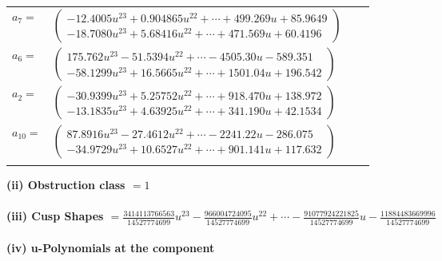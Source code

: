 \documentclass[1p]{elsarticle_modified}
\theoremstyle{definition}
\begin{document}
\begin{tabular}{m{7pt} m{180pt} m{7pt} m{180pt} }
\flushright $a_{7}=$&$\begin{pmatrix}-12.4005 u^{23}+0.904865 u^{22}+\cdots+499.269 u+85.9649\\-18.7080 u^{23}+5.68416 u^{22}+\cdots+471.569 u+60.4196\end{pmatrix}$ \\
\flushright $a_{6}=$&$\begin{pmatrix}175.762 u^{23}-51.5394 u^{22}+\cdots-4505.30 u-589.351\\-58.1299 u^{23}+16.5665 u^{22}+\cdots+1501.04 u+196.542\end{pmatrix}$ \\
\flushright $a_{2}=$&$\begin{pmatrix}-30.9399 u^{23}+5.25752 u^{22}+\cdots+918.470 u+138.972\\-13.1835 u^{23}+4.63925 u^{22}+\cdots+341.190 u+42.1534\end{pmatrix}$ \\
\flushright $a_{10}=$&$\begin{pmatrix}87.8916 u^{23}-27.4612 u^{22}+\cdots-2241.22 u-286.075\\-34.9729 u^{23}+10.6527 u^{22}+\cdots+901.141 u+117.632\end{pmatrix}$\\&\end{tabular}
\flushleft \textbf{(ii) Obstruction class $= 1$}\\~\\
\flushleft \textbf{(iii) Cusp Shapes $= \frac{3414113766563}{14527774699} u^{23}-\frac{966004724095}{14527774699} u^{22}+\cdots-\frac{91077924221825}{14527774699} u-\frac{11884483669996}{14527774699}$}\\~\\
\newpage\renewcommand{\arraystretch}{1}
\flushleft \textbf{(iv) u-Polynomials at the component}\newline \\
\end{document}
